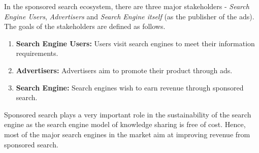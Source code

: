In the sponsored search ecosystem, there are three major stakeholders - \textit{Search Engine Users}, \textit{Advertisers} and \textit{Search Engine itself} (as the publisher of the ads). The goals of the stakeholders are defined as follows.
\begin{enumerate}[label=(\roman*).]
    \item\textbf{Search Engine Users:} Users visit search engines to meet their information requirements. 
    
    \item \textbf{Advertisers:} Advertisers aim to promote their product through ads.
    
    \item\textbf{Search Engine:} Search engines wish to earn revenue through sponsored search.
\end{enumerate}

Sponsored search plays a very important role in the sustainability of the search engine as the search engine model of knowledge sharing is free of cost. Hence, most of the major search engines in the market aim at improving revenue from sponsored search.





